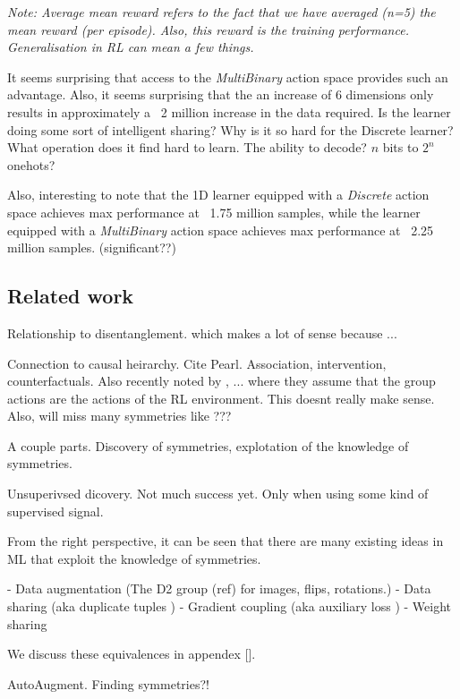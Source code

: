 \textit{Note: Average mean reward refers to the fact that we have averaged (n=5)
the mean reward (per episode). Also, this reward is the training performance.
Generalisation in RL can mean a few things.}

It seems surprising that access to the \textit{MultiBinary} action space provides such an advantage.
Also, it seems surprising that the an increase of 6 dimensions only results in approximately a ~2 million increase in the data required.
Is the learner doing some sort of intelligent sharing?
Why is it so hard for the Discrete learner? What operation does it find hard to learn. The ability to decode? $n$ bits to $2^n$ onehots?

Also, interesting to note that the 1D learner equipped with a \textit{Discrete}
action space achieves max performance at ~1.75 million samples, while the learner
equipped with a \textit{MultiBinary} action space achieves max performance at ~2.25 million samples. (significant??)


\subsection{Related work}

Relationship to disentanglement. \cite{Higgins2018} which makes a lot of sense because ...

Connection to causal heirarchy. Cite Pearl. Association, intervention, counterfactuals.
Also recently noted by \cite{Caselles-Dupre2019}, ... where they assume that
the group actions are the actions of the RL environment.
This doesnt really make sense. Also, will miss many symmetries like ???

A couple parts. Discovery of symmetries, explotation of the knowledge of symmetries.

Unsuperivsed dicovery. Not much success yet. Only when using some kind of supervised signal.


From the right perspective, it can be seen that there are many existing ideas in
 ML that exploit the knowledge of symmetries.

- Data augmentation (The D2 group (ref) for images, flips, rotations.)
- Data sharing (aka duplicate tuples \cite{Ho2019a})
- Gradient coupling (aka auxiliary loss \cite{Ho2019a})
- Weight sharing \cite{Ravanbakhsh2017a}

We discuss these equivalences in appendex [].


AutoAugment. Finding symmetries?!
\cite{Ho2019a}
